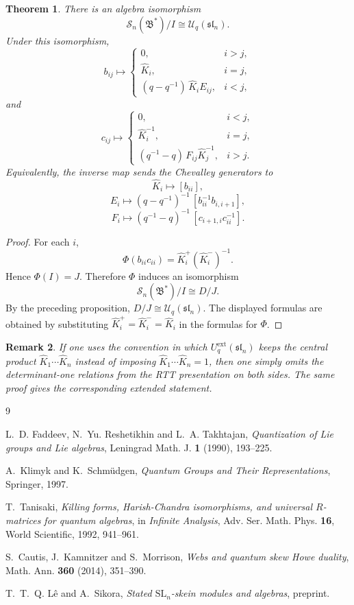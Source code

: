 \documentclass[11pt]{article}
\newtheorem{theorem}{Theorem}[section]
\newtheorem{remark}[theorem]{Remark}
\newcommand{\Uc}{\mathcal U}
\newcommand{\Sc}{\mathcal S}
\newcommand{\fB}{\mathfrak B}
\newcommand{\slfr}{\mathfrak{sl}}
\begin{document}
\begin{theorem}
There is an algebra isomorphism
\[
\Sc_n(\fB^*)/I \cong \Uc_q(\slfr_n).
\]
Under this isomorphism,
\[
b_{ij}\longmapsto
\begin{cases}
0,& i>j,\\[2mm]
\widehat K_i,& i=j,\\[2mm]
(q-q^{-1})\,\widehat K_iE_{ij},& i<j,
\end{cases}
\]
and
\[
c_{ij}\longmapsto
\begin{cases}
0,& i<j,\\[2mm]
\widehat K_i^{-1},& i=j,\\[2mm]
(q^{-1}-q)\,F_{ij}\widehat K_j^{-1},& i>j.
\end{cases}
\]
Equivalently, the inverse map sends the Chevalley generators to
\[
\widehat K_i\longmapsto [b_{ii}],
\]
\[
E_i\longmapsto (q-q^{-1})^{-1}\,[b_{ii}^{-1}b_{i,i+1}],
\]
\[
F_i\longmapsto (q^{-1}-q)^{-1}\,[c_{i+1,i}c_{ii}^{-1}].
\]
\end{theorem}

\begin{proof}
For each \(i\),
\[
\Phi(b_{ii}c_{ii})
=
\widehat K_i^+(\widehat K_i^-)^{-1}.
\]
Hence \(\Phi(I)=J\).  Therefore \(\Phi\) induces an isomorphism
\[
\Sc_n(\fB^*)/I
\cong
D/J.
\]
By the preceding proposition, \(D/J\cong \Uc_q(\slfr_n)\).  The displayed formulas are obtained by substituting \(\widehat K_i^+=\widehat K_i^-=\widehat K_i\) in the formulas for \(\Phi\).
\end{proof}

\begin{remark}
If one uses the convention in which \(U_q^{\mathrm{ext}}(\slfr_n)\) keeps the central product \(\widehat K_1\cdots \widehat K_n\) instead of imposing \(\widehat K_1\cdots \widehat K_n=1\), then one simply omits the determinant-one relations from the RTT presentation on both sides.  The same proof gives the corresponding extended statement.
\end{remark}

\begin{thebibliography}{9}

L.~D. Faddeev, N.~Yu. Reshetikhin and L.~A. Takhtajan,
\emph{Quantization of Lie groups and Lie algebras},
Leningrad Math. J. \textbf{1} (1990), 193--225.

A.~Klimyk and K.~Schm\"udgen,
\emph{Quantum Groups and Their Representations},
Springer, 1997.

T.~Tanisaki,
\emph{Killing forms, Harish-Chandra isomorphisms, and universal \(R\)-matrices for quantum algebras},
in \emph{Infinite Analysis}, Adv. Ser. Math. Phys. \textbf{16},
World Scientific, 1992, 941--961.

S.~Cautis, J.~Kamnitzer and S.~Morrison,
\emph{Webs and quantum skew Howe duality},
Math. Ann. \textbf{360} (2014), 351--390.

T.~T.~Q. L\^e and A.~Sikora,
\emph{Stated \(\mathrm{SL}_n\)-skein modules and algebras},
preprint.

\end{thebibliography}
\end{document}
